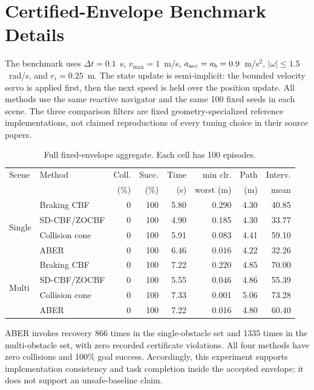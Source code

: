 \documentclass[letterpaper]{article}
\begin{document}
\section{Certified-Envelope Benchmark Details}

The benchmark uses
$\Delta t=0.1$~s, $v_{\max}=1$~m/s,
$a_{\rm acc}=a_b=0.9$~m/s$^2$,
$|\omega|\le1.5$~rad/s, and $r_i=0.25$~m.
The state update is semi-implicit: the bounded velocity servo is applied
first, then the next speed is held over the position update.  All methods use
the same reactive navigator and the same 100 fixed seeds in each scene.
The three comparison filters are fixed geometry-specialized reference
implementations, not claimed reproductions of every tuning choice in their
source papers.

\begin{table}[t]
\centering
\small
\setlength{\tabcolsep}{2.4pt}
\begin{tabular}{llrrrrrr}
\toprule
Scene & Method & Coll. & Succ. & Time & min clr. & Path & Interv.\\
 & & (\%) & (\%) & (s) & worst (m) & (m) & mean\\
\midrule
\multirow{4}{*}{Single}
& Braking CBF & 0 & 100 & 5.80 & 0.290 & 4.30 & 40.85\\
& SD-CBF/ZOCBF & 0 & 100 & 4.90 & 0.185 & 4.30 & 33.77\\
& Collision cone & 0 & 100 & 5.91 & 0.083 & 4.41 & 59.10\\
& ABER & 0 & 100 & 6.46 & 0.016 & 4.22 & 32.26\\
\midrule
\multirow{4}{*}{Multi}
& Braking CBF & 0 & 100 & 7.22 & 0.220 & 4.85 & 70.00\\
& SD-CBF/ZOCBF & 0 & 100 & 5.55 & 0.046 & 4.86 & 55.39\\
& Collision cone & 0 & 100 & 7.33 & 0.001 & 5.06 & 73.28\\
& ABER & 0 & 100 & 7.22 & 0.016 & 4.80 & 60.40\\
\bottomrule
\end{tabular}
\caption{Full fixed-envelope aggregate.  Each cell has 100 episodes.}
\label{tab:certfull}
\end{table}

ABER invokes recovery 866 times in the single-obstacle set and 1335 times in
the multi-obstacle set, with zero recorded certificate violations.  All four
methods have zero collisions and 100\% goal success.  Accordingly, this
experiment supports implementation consistency and task completion inside
the accepted envelope; it does not support an unsafe-baseline claim.
\end{document}

